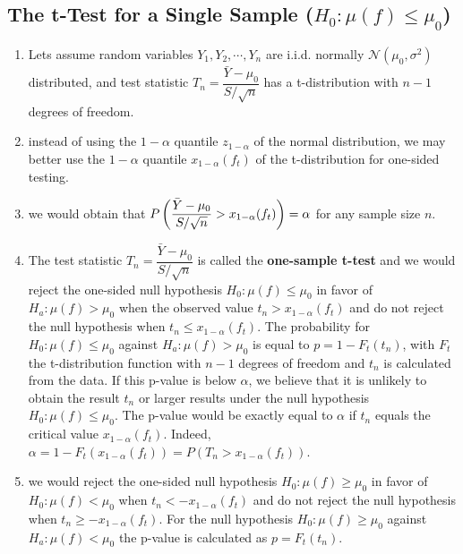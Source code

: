 \subsection{The t-Test for a Single Sample ($H_0 : \mu( f ) \leq \mu_0$)}

\begin{enumerate}
    \item Lets assume random variables $Y_1 , Y_2, \cdots , Y_n$ are i.i.d. normally $\mathcal{N} (\mu_0, \sigma^2)$ distributed, and test statistic $T_n = \dfrac{\bar{Y} - \mu_0}{S/\sqrt{n}}$ has a t-distribution with $n - 1$ degrees of freedom.
    \hfill \cite{statistics/book/Statistics-for-Data-Scientists/Maurits-Kaptein}

    \item instead of using the $1 - \alpha$ quantile $z_{1-\alpha}$ of the normal distribution, we may better use the $1 - \alpha$ quantile $x_{1-\alpha}( f_t )$ of the t-distribution for one-sided testing. 
    \hfill \cite{statistics/book/Statistics-for-Data-Scientists/Maurits-Kaptein}

    \item we would obtain that $P\left(\dfrac{\bar{Y} - \mu_0}{S/\sqrt{n}} > x_{1-\alpha}( f_t )\right) = \alpha$ for any sample size $n$. 
    \hfill \cite{statistics/book/Statistics-for-Data-Scientists/Maurits-Kaptein}

    \item The test statistic $T_n = \dfrac{\bar{Y} - \mu_0}{S/\sqrt{n}}$ is called the \textbf{one-sample t-test} and we would reject the one-sided null hypothesis $H_0 : \mu( f ) \leq \mu_0$ in favor of $H_a : \mu( f ) > \mu_0$ when the observed value $t_n > x_{1-\alpha}( f_t )$ and do not reject the null hypothesis when $t_n \leq x_{1-\alpha}( f_t )$.
    The probability for $H_0 : \mu( f ) \leq \mu_0$ against $H_a : \mu( f ) > \mu_0$ is equal to $p = 1 - F_t (t_ n )$, with $F_t$ the t-distribution function with $n - 1$ degrees of freedom and $t_n$ is calculated from the data. 
    If this p-value is below $\alpha$, we believe that it is unlikely to obtain the result $t _n$ or larger results under the null hypothesis $H_0 : \mu( f ) \leq \mu_0 $. 
    The p-value would be exactly equal to $\alpha$ if $t _n$ equals the critical value $x_{1-\alpha}( f_ t )$. 
    Indeed, $\alpha = 1 - F_t (x_{1-\alpha}( f_ t )) = P(T_n > x_{1-\alpha}( f_ t ))$.
    \hfill \cite{statistics/book/Statistics-for-Data-Scientists/Maurits-Kaptein}

    \item we would reject the one-sided null hypothesis $H_0 : \mu( f ) \geq \mu_0$ in favor of $H_0 : \mu( f ) < \mu_0$ when $t_ n < -x_{1-\alpha}( f_ t )$ and do not reject the null hypothesis when $t_ n \geq -x_{1-\alpha}( f_ t )$.
    For the null hypothesis $H_0 : \mu( f ) \geq \mu_0$ against $H_a : \mu( f ) < \mu_0$ the p-value is calculated as $p = F_t (t _n )$. 
    \hfill \cite{statistics/book/Statistics-for-Data-Scientists/Maurits-Kaptein}


\end{enumerate}
